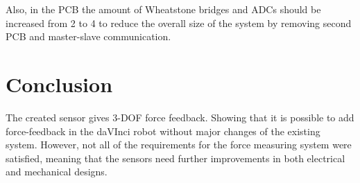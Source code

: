     Also, in the PCB the amount of Wheatstone bridges and ADCs should be increased from 2 to 4 to reduce the overall size of the system by removing second PCB and master-slave communication.
	
\section{Conclusion}

The created sensor gives 3-DOF force feedback. Showing that it is possible to add force-feedback in the daVInci robot without major changes of the existing system. However, not all of the requirements for the force measuring system were satisfied, meaning that the sensors need further improvements in both electrical and mechanical designs.